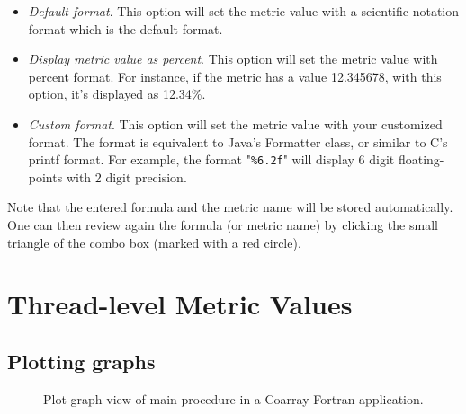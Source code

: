 \begin{itemize}
\begin{itemize}
\item \textit{Default format}. This option will set the metric value with a scientific notation format which is the default format.

\item \textit{Display metric value as percent}. This option will set the metric value with percent format. For instance, if the metric has a value 12.345678, with this option, it's displayed as 12.34\%.

\item \textit{Custom format}. This option will set the metric value with your customized format. The format is equivalent to Java's Formatter class, or similar to C's printf format. For example, the format "\texttt{\%6.2f}" will display 6 digit floating-points with 2 digit precision.

\end{itemize}

\end{itemize}

Note that the entered formula and the metric name will be stored automatically.
One can then review again the formula (or metric name) by clicking the small triangle of the combo box (marked with a red circle).



\section{Thread-level Metric Values}
\label{sec:hpcviewer:thread-level}

\subsection{Plotting graphs}
\label{sec:hpcviewer:plots}
\begin{figure}[t]
\caption{Plot graph view of main procedure in a Coarray Fortran application.}
\label{fig:hpcviewer-view-scatterplot}
\end{figure}


